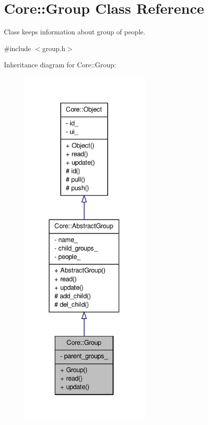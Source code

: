 \hypertarget{classCore_1_1Group}{
\section{Core::Group Class Reference}
\label{d2/d30/classCore_1_1Group}
}


Class keeps information about group of people.  




{\ttfamily \#include $<$group.h$>$}



Inheritance diagram for Core::Group:
\nopagebreak
\begin{figure}[H]
\begin{center}
\leavevmode
\includegraphics[width=186pt]{d6/d15/classCore_1_1Group__inherit__graph}
\end{center}
\end{figure}


